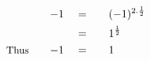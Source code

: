 \begin{alignat*}{5}
&\,&-1\quad&=\quad&&(-1)^{2.\frac{1}{2}}\\
&\,&\,&=&&1^\frac{1}{2}\\
&\small\text{Thus}\quad&-1\quad&=&&1
\end{alignat*}
